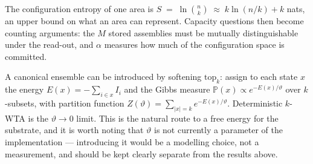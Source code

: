 \documentclass[11pt]{article}
\theoremstyle{definition}
\theoremstyle{plain}
\newcommand{\wta}{\mathrm{top}_k}
\newcommand{\Prob}{\mathbb{P}}
\begin{document}
The configuration entropy of one area is
\(
  S \;=\; \ln\binom{n}{k} \;\approx\; k\ln(n/k) + k
\)
nats, an upper bound on what an area can represent. Capacity questions then
become counting arguments: the $M$ stored assemblies must be mutually
distinguishable under the read-out, and $\alpha$ measures how much of the
configuration space is committed.

A canonical ensemble can be introduced by softening $\wta$: assign to each
state $x$ the energy $E(x) = -\sum_{i \in x} I_i$ and the Gibbs measure
$\Prob(x) \propto e^{-E(x)/\vartheta}$ over $k$-subsets, with partition function
$Z(\vartheta) = \sum_{|x|=k} e^{-E(x)/\vartheta}$. Deterministic $k$-WTA is the
$\vartheta \to 0$ limit. This is the natural route to a free energy for the
substrate, and it is worth noting that $\vartheta$ is not currently a parameter of
the implementation --- introducing it would be a modelling choice, not a
measurement, and should be kept clearly separate from the results above.
\end{document}
